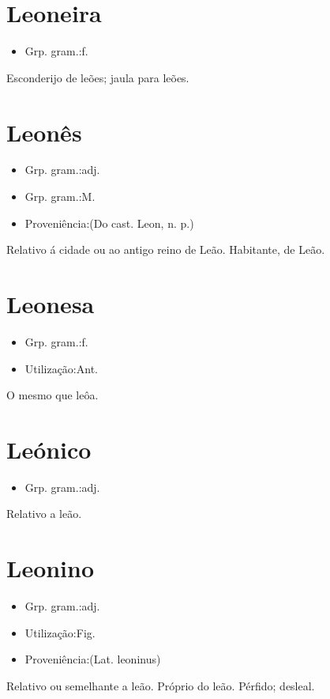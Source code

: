 \section{Leoneira}
\begin{itemize}
\item {Grp. gram.:f.}
\end{itemize}
Esconderijo de leões; jaula para leões.
\section{Leonês}
\begin{itemize}
\item {Grp. gram.:adj.}
\end{itemize}
\begin{itemize}
\item {Grp. gram.:M.}
\end{itemize}
\begin{itemize}
\item {Proveniência:(Do cast. \textunderscore Leon\textunderscore , n. p.)}
\end{itemize}
Relativo á cidade ou ao antigo reino de Leão.
Habitante, de Leão.
\section{Leonesa}
\begin{itemize}
\item {Grp. gram.:f.}
\end{itemize}
\begin{itemize}
\item {Utilização:Ant.}
\end{itemize}
O mesmo que \textunderscore leôa\textunderscore .
\section{Leónico}
\begin{itemize}
\item {Grp. gram.:adj.}
\end{itemize}
Relativo a leão.
\section{Leonino}
\begin{itemize}
\item {Grp. gram.:adj.}
\end{itemize}
\begin{itemize}
\item {Utilização:Fig.}
\end{itemize}
\begin{itemize}
\item {Proveniência:(Lat. \textunderscore leoninus\textunderscore )}
\end{itemize}
Relativo ou semelhante a leão.
Próprio do leão.
Pérfido; desleal.
